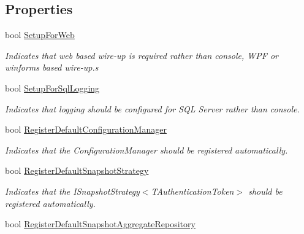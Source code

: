 \subsection*{Properties}
\begin{DoxyCompactItemize}
\item 
bool \hyperlink{classCqrs_1_1Ninject_1_1Configuration_1_1CqrsModule_ae4bbc2d44f283644a328d308dc78edc5_ae4bbc2d44f283644a328d308dc78edc5}{Setup\+For\+Web}
\begin{DoxyCompactList}\small\item\em Indicates that web based wire-\/up is required rather than console, W\+PF or winforms based wire-\/up.\+s \end{DoxyCompactList}\item 
bool \hyperlink{classCqrs_1_1Ninject_1_1Configuration_1_1CqrsModule_a10e7a8adbe03fc05ebb7003727cbe541_a10e7a8adbe03fc05ebb7003727cbe541}{Setup\+For\+Sql\+Logging}
\begin{DoxyCompactList}\small\item\em Indicates that logging should be configured for S\+QL Server rather than console. \end{DoxyCompactList}\item 
bool \hyperlink{classCqrs_1_1Ninject_1_1Configuration_1_1CqrsModule_a7e5a1cbb5bcfda3bcc06dc24a38995e2_a7e5a1cbb5bcfda3bcc06dc24a38995e2}{Register\+Default\+Configuration\+Manager}
\begin{DoxyCompactList}\small\item\em Indicates that the Configuration\+Manager should be registered automatically. \end{DoxyCompactList}\item 
bool \hyperlink{classCqrs_1_1Ninject_1_1Configuration_1_1CqrsModule_a79516f565ce235cc42c3c31e281824b8_a79516f565ce235cc42c3c31e281824b8}{Register\+Default\+Snapshot\+Strategy}
\begin{DoxyCompactList}\small\item\em Indicates that the I\+Snapshot\+Strategy$<$\+T\+Authentication\+Token$>$ should be registered automatically. \end{DoxyCompactList}\item 
bool \hyperlink{classCqrs_1_1Ninject_1_1Configuration_1_1CqrsModule_ace2719e6bb393336cc5b7d4e7e0550e3_ace2719e6bb393336cc5b7d4e7e0550e3}{Register\+Default\+Snapshot\+Aggregate\+Repository}

\end{DoxyCompactItemize}
